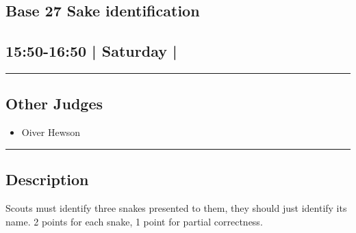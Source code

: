 \documentclass[10pt, A5]{article}
\begin{document}
		\begin{framed}
			\begin{minipage}{\textwidth}

			\setcounter{section}{59}
							\section{\faStar \: Base 27 \faStar \: Sake identification}
						
			\subsection*{15:50-16:50 | Saturday | }

			\vspace{0.25cm}
			\hrule
			\vspace{0.25cm}


			\subsection*{Other Judges}
							

				\begin{multicols}{2}

			\begin{itemize}
											\item Oiver Hewson
								\end{itemize}

			\vfill\null
			\columnbreak

			\begin{itemize}
								\end{itemize}

			\vfill\null

			\end{multicols}

			\vspace{0.25cm}
			\hrule
			\vspace{0.25cm}

			\begin{minipage}{\textwidth}
			\subsection*{\faListAlt \: Description}
			Scouts must identify three snakes presented to them, they should just identify its name. 2 points for each snake, 1 point for partial correctness.
			\end{minipage}


	\end{minipage}
	\end{framed}
\end{document}
